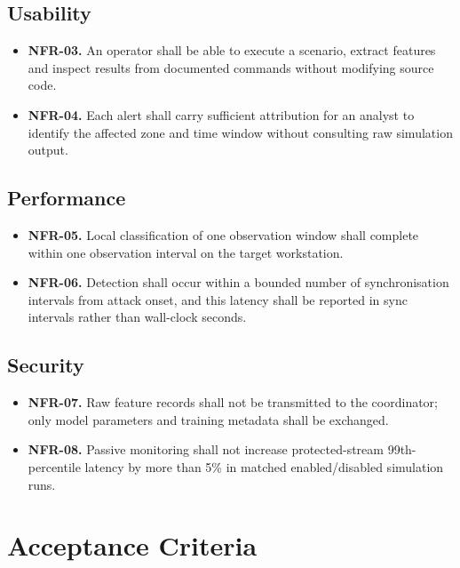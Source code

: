 \subsection{Usability}
\begin{itemize}
\item \textbf{NFR-03.} An operator shall be able to execute a scenario, extract
features and inspect results from documented commands without modifying source code.
\item \textbf{NFR-04.} Each alert shall carry sufficient attribution for an analyst to
identify the affected zone and time window without consulting raw simulation output.
\end{itemize}

\subsection{Performance}
\begin{itemize}
\item \textbf{NFR-05.} Local classification of one observation window shall complete
within one observation interval on the target workstation.
\item \textbf{NFR-06.} Detection shall occur within a bounded number of
synchronisation intervals from attack onset, and this latency shall be reported in
sync intervals rather than wall-clock seconds.
\end{itemize}

\subsection{Security}
\begin{itemize}
\item \textbf{NFR-07.} Raw feature records shall not be transmitted to the
coordinator; only model parameters and training metadata shall be exchanged.
\item \textbf{NFR-08.} Passive monitoring shall not increase protected-stream
99th-percentile latency by more than 5\% in matched enabled/disabled simulation runs.
\end{itemize}


\section{Acceptance Criteria}
\label{sec:acceptance-criteria}

